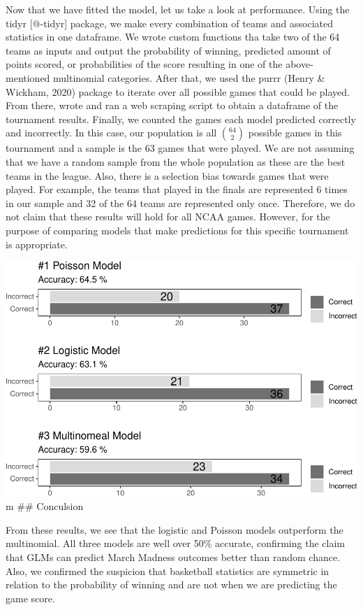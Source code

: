 \documentclass[
  man,floatsintext]{apa6}
\begin{document}
Now that we have fitted the model, let us take a look at performance. Using the tidyr {[}@-tidyr{]} package, we make every combination of teams and associated statistics in one dataframe. We wrote custom functions tha take two of the 64 teams as inputs and output the probability of winning, predicted amount of points scored, or probabilities of the score resulting in one of the above-mentioned multinomial categories. After that, we used the purrr (Henry \& Wickham, 2020) package to iterate over all possible games that could be played. From there, wrote and ran a web scraping script to obtain a dataframe of the tournament results. Finally, we counted the games each model predicted correctly and incorrectly. In this case, our population is all \({64\choose 2}\) possible games in this tournament and a sample is the 63 games that were played. We are not assuming that we have a random sample from the whole population as these are the best teams in the league. Also, there is a selection bias towards games that were played. For example, the teams that played in the finals are represented 6 times in our sample and 32 of the 64 teams are represented only once. Therefore, we do not claim that these results will hold for all NCAA games. However, for the purpose of comparing models that make predictions for this specific tournament is appropriate.

\includegraphics{paper_files/figure-latex/unnamed-chunk-6-1.pdf}
m
\#\# Conculsion

From these results, we see that the logistic and Poisson models outperform the multinomial. All three models are well over 50\% accurate, confirming the claim that GLMs can predict March Madness outcomes better than random chance. Also, we confirmed the suspicion that basketball statistics are symmetric in relation to the probability of winning and are not when we are predicting the game score.
\end{document}

